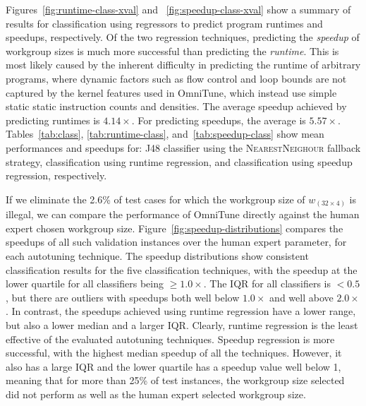 \documentclass[nonatbib,preprint,10pt]{sigplanconf}
\begin{document}
Figures~\ref{fig:runtime-class-xval} and ~\ref{fig:speedup-class-xval}
show a summary of results for classification using regressors to
predict program runtimes and speedups, respectively. Of the two
regression techniques, predicting the \emph{speedup} of workgroup
sizes is much more successful than predicting the \emph{runtime}. This
is most likely caused by the inherent difficulty in predicting the
runtime of arbitrary programs, where dynamic factors such as flow
control and loop bounds are not captured by the kernel features used
in OmniTune, which instead use simple static static instruction counts
and densities. The average speedup achieved by predicting runtimes is
$4.14\times$. For predicting speedups, the average is $5.57\times$.
Tables~\ref{tab:class}, \ref{tab:runtime-class},
and~\ref{tab:speedup-class} show mean performances and speedups for:
J48 classifier using the \textsc{NearestNeighour} fallback strategy,
classification using runtime regression, and classification using
speedup regression, respectively.

If we eliminate the 2.6\% of test cases for which the workgroup size
of $w_{(32 \times 4)}$ is illegal, we can compare the performance of
OmniTune directly against the human expert chosen workgroup
size. Figure~\ref{fig:speedup-distributions} compares the speedups of
all such validation instances over the human expert parameter, for
each autotuning technique. The speedup distributions show consistent
classification results for the five classification techniques, with
the speedup at the lower quartile for all classifiers being
$\ge 1.0\times$. The IQR for all classifiers is $< 0.5$, but there are
outliers with speedups both well below $1.0\times$ and well above
$2.0\times$. In contrast, the speedups achieved using runtime
regression have a lower range, but also a lower median and a larger
IQR. Clearly, runtime regression is the least effective of the
evaluated autotuning techniques. Speedup regression is more
successful, with the highest median speedup of all the
techniques. However, it also has a large IQR and the lower quartile
has a speedup value well below 1, meaning that for more than 25\% of
test instances, the workgroup size selected did not perform as well as
the human expert selected workgroup size.

\end{document}

